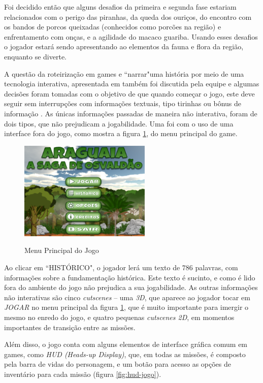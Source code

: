 Foi decidido então que alguns desafios da primeira e segunda fase estariam relacionados com o perigo das piranhas, da queda dos ouriços, do encontro com os bandos de porcos queixadas (conhecidos como porcões na região) e enfrentamento com onças, e a agilidade do macaco guariba. Usando esses desafios o jogador estará sendo apresentando ao elementos da fauna e flora da região, enquanto se diverte.

A questão da roteirização em games e ``narrar"\space uma história por meio de uma tecnologia interativa, apresentada em  também foi discutida pela equipe e algumas decisões foram tomadas com o objetivo de que quando começar o jogo, este deve seguir sem interrupções com informações textuais, tipo tirinhas \cite{bib:bb2016} ou bônus de informação \cite{bib:teixeira2016}. As únicas informações passadas de maneira não interativa, foram de dois tipos, que não prejudicam a jogabilidade. Uma foi com o uso de uma interface fora do jogo, como mostra a figura \ref{fig:menu-jogo}, do menu principal do game.

\begin{figure}[H]
	\centering
	\caption{Menu Principal do Jogo}
	\includegraphics[width=0.56\textwidth]{figuras/menu_principal.png}
	\label{fig:menu-jogo}
	{}
\end{figure}

Ao clicar em ``HISTÓRICO", o jogador lerá um texto de $786$ palavras, com informações sobre a fundamentação histórica. Este texto é sucinto, e como é lido fora do ambiente do jogo não prejudica a sua jogabilidade. As outras informações não interativas são cinco \textit{cutscenes} -- uma \textit{3D}, que aparece ao jogador tocar em \textit{JOGAR} no menu principal da figura \ref{fig:menu-jogo}, que é muito importante para imergir o mesmo no enredo do jogo, e quatro pequenas \textit{cutscenes 2D}, em momentos importantes de transição entre as missões.

Além disso, o jogo conta com alguns elementos de interface gráfica comum em games, como \textit{HUD (Heads-up Display)}, que, em todas as missões, é composto pela barra de vidas do personagem, e um botão para acesso as opções de inventário para cada missão (figura \ref{fig:hud-jogo}).


